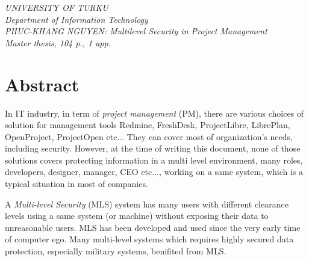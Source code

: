 

\begin{flushleft}{\slshape    
UNIVERSITY OF TURKU \\
Department of Information Technology \\
\medskip
PHUC-KHANG NGUYEN: Multilevel Security in Project Management \\
\medskip
Master thesis, 104 p., 1 app. \\
} 
\end{flushleft}


\begingroup
\let\clearpage\relax
\let\cleardoublepage\relax
\let\cleardoublepage\relax

\chapter*{Abstract} %

In IT industry, in term of \emph{project management} (PM), there are various choices of solution for management tools \eg Redmine, FreshDesk, ProjectLibre, LibrePlan, OpenProject, ProjectOpen etc...
They can cover most of organization's needs, including security.
However, at the time of writing this document, none of those solutions covers protecting information in a multi level environment, \ie many roles, \eg developers, designer, manager, CEO etc..., working on a same system, which is a typical situation in most of companies. 

A \emph{Multi-level Security} (MLS) system has many users with different clearance levels using a same system (or machine) without exposing their data to unreasonable users.
MLS has been developed and used since the very early time of computer ego.
Many multi-level systems which requires highly secured data protection, especially military systems, benifited from MLS.

